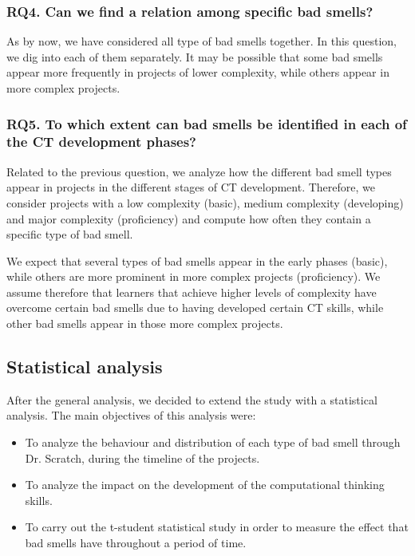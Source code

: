 \subsubsection{RQ4. Can we find a relation among specific bad smells?}
\label{subsubsec:RQ4}

As by now, we have considered all type of bad smells together. In this question, we dig into each of them separately. It may be possible that some bad smells appear more frequently in projects of lower complexity, while others appear in more complex projects.

\subsubsection{RQ5. To which extent can bad smells be identified in each of the CT development phases?}
\label{subsubsec:RQ5}

Related to the previous question, we analyze how the different bad smell types appear in projects in the different stages of CT development. Therefore, we consider projects with a low complexity (basic), medium complexity (developing) and major complexity (proficiency) and compute how often they contain a specific type of bad smell.

We expect that several types of bad smells appear in the early phases (basic), while others are more prominent in more complex projects (proficiency). We assume therefore that learners that achieve higher levels of complexity have overcome certain bad smells due to having developed certain CT skills, while other bad smells appear in those more complex projects.


\subsection{Statistical analysis}
\label{subsec:statisticalanalysis}

After the general analysis, we decided to extend the study with a statistical analysis. The main objectives of this analysis were: 

\begin{itemize}
    \item To analyze the behaviour and distribution of each type of bad smell through Dr. Scratch, during the timeline of the projects.
    \item To analyze the impact on the development of the computational thinking skills.
    \item To carry out the t-student statistical study in order to measure the effect that bad smells have throughout a period of time. 
\end{itemize}

